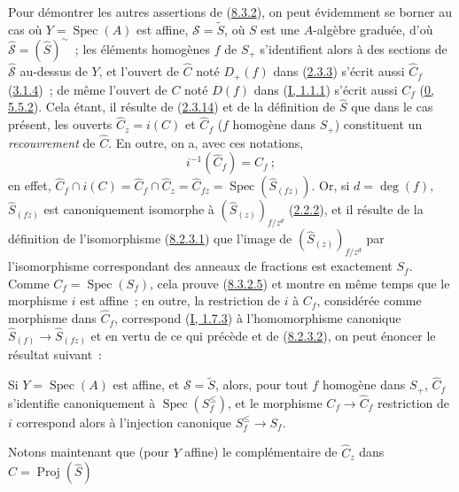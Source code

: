 Pour démontrer les autres assertions de
(\hyperref[II.8.3.2-fr]{8.3.2}), on peut évidemment se borner au cas où
$Y=\operatorname{Spec}(A)$ est affine, $\mathcal{S}=\widetilde{S}$, où $S$
est une $A$-algèbre graduée, d'où
$\widehat{\mathcal{S}}=(\widehat{S})^{\sim}$~; les éléments homogènes $f$ de
$S_+$ s'identifient alors à des sections de $\widehat{\mathcal{S}}$ au-dessus
de $Y$, et l'ouvert de $\widehat{C}$ noté $D_+(f)$ dans
(\hyperref[II.2.3.3-fr]{2.3.3}) s'écrit aussi $\widehat{C}_f$
(\hyperref[II.3.1.4-fr]{3.1.4})~; de même l'ouvert de $C$ noté $D(f)$ dans
(\hyperref[I.1.1.1-fr]{I, 1.1.1}) s'écrit aussi $C_f$
(\hyperref[0.5.5.2-fr]{0, 5.5.2}). Cela étant, il résulte de
(\hyperref[II.2.3.14-fr]{2.3.14}) et de la définition de $\widehat{S}$ que
dans le cas présent, les ouverts $\widehat{C}_z=i(C)$ et $\widehat{C}_f$
($f$ homogène dans $S_+$) constituent un \emph{recouvrement} de
$\widehat{C}$. En outre, on a, avec ces notations,
\begin{equation}
\label{II.8.3.2.5-fr}
  i^{-1}(\widehat{C}_f)=C_f~;
\tag{8.3.2.5}
\end{equation}
en effet,
$\widehat{C}_f\cap i(C)=\widehat{C}_f\cap\widehat{C}_z
=\widehat{C}_{fz}=\operatorname{Spec}(\widehat{S}_{(fz)})$. Or, si
$d=\deg(f)$, $\widehat{S}_{(fz)}$ est canoniquement isomorphe à
$(\widehat{S}_{(z)})_{f/z^d}$ (\hyperref[II.2.2.2-fr]{2.2.2}), et il résulte
de la définition de l'isomorphisme
(\hyperref[II.8.2.3.1-fr]{8.2.3.1}) que l'image de
$(\widehat{S}_{(z)})_{f/z^d}$ par l'isomorphisme correspondant des anneaux de
fractions est exactement $S_f$. Comme $C_f=\operatorname{Spec}(S_f)$, cela
prouve (\hyperref[II.8.3.2.5-fr]{8.3.2.5}) et montre en même temps que le
morphisme $i$ est affine~; en outre, la restriction de $i$ à $C_f$,
considérée comme morphisme dans $\widehat{C}_f$, correspond
(\hyperref[I.1.7.3-fr]{I, 1.7.3}) à l'homomorphisme canonique
$\widehat{S}_{(f)}\to\widehat{S}_{(fz)}$ et en vertu de ce qui précède et de
(\hyperref[II.8.2.3.2-fr]{8.2.3.2}), on peut énoncer le résultat suivant~:

\begin{env}[8.3.2.6]
\label{II.8.3.2.6-fr}
Si $Y=\operatorname{Spec}(A)$ est affine, et $\mathcal{S}=\widetilde{S}$,
alors, pour tout $f$ homogène dans $S_+$, $\widehat{C}_f$ s'identifie
canoniquement à $\operatorname{Spec}(S_f^{\leq})$, et le morphisme
$C_f\to\widehat{C}_f$ restriction de $i$ correspond alors à l'injection
canonique $S_f^{\leq}\to S_f$.
\end{env}

Notons maintenant que (pour $Y$ affine) le complémentaire de
$\widehat{C}_z$ dans $\widehat{C}=\operatorname{Proj}(\widehat{S})$

